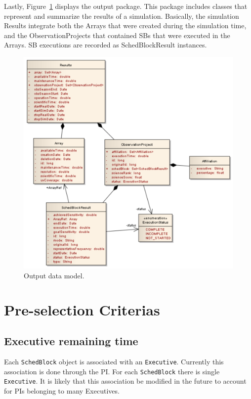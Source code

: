 \documentclass{article}
\begin{document}
Lastly, Figure~\ref{fig:outputdm}  displays the output package. This package includes classes that represent and summarize
the results of a simulation. Basically, the simulation Results integrate both the Arrays that were created
during the simulation time, and the ObservationProjects that contained SBs that were executed in the
Arrays. SB executions are recorded as SchedBlockResult instances.

\begin{figure}
\includegraphics[width=\textwidth]{Output.pdf}
\caption{Output data model.}
\label{fig:outputdm}
\end{figure}

\section{Pre-selection Criterias}

\subsection{Executive remaining time}

Each {\tt SchedBlock} object is associated with an {\tt Executive}. Currently this association is
done through the PI. For each {\tt SchedBlock} there is single {\tt Executive}. It is likely that this
association be modified in the future to account for PIs belonging to many Executives.
\end{document}
